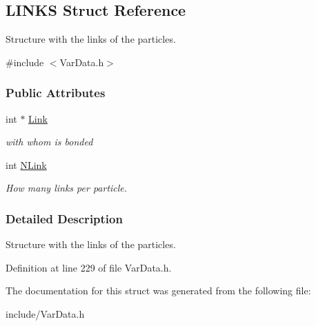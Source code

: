 \hypertarget{structLINKS}{\subsection{\-L\-I\-N\-K\-S \-Struct \-Reference}
\label{structLINKS}
}


\-Structure with the links of the particles.  




{\ttfamily \#include $<$\-Var\-Data.\-h$>$}

\subsubsection*{\-Public \-Attributes}
\begin{DoxyCompactItemize}
\item 
\hypertarget{structLINKS_aefc83dee460fda66ca240e011e7ce0a7}{int $\ast$ \hyperlink{structLINKS_aefc83dee460fda66ca240e011e7ce0a7}{\-Link}}\label{structLINKS_aefc83dee460fda66ca240e011e7ce0a7}

\begin{DoxyCompactList}\small\item\em with whom is bonded \end{DoxyCompactList}\item 
\hypertarget{structLINKS_a73918a2decc99bcf2317d2855dada6c8}{int \hyperlink{structLINKS_a73918a2decc99bcf2317d2855dada6c8}{\-N\-Link}}\label{structLINKS_a73918a2decc99bcf2317d2855dada6c8}

\begin{DoxyCompactList}\small\item\em \-How many links per particle. \end{DoxyCompactList}\end{DoxyCompactItemize}


\subsubsection{\-Detailed \-Description}
\-Structure with the links of the particles. 

\-Definition at line 229 of file \-Var\-Data.\-h.



\-The documentation for this struct was generated from the following file\-:\begin{DoxyCompactItemize}
\item 
include/\-Var\-Data.\-h\end{DoxyCompactItemize}
